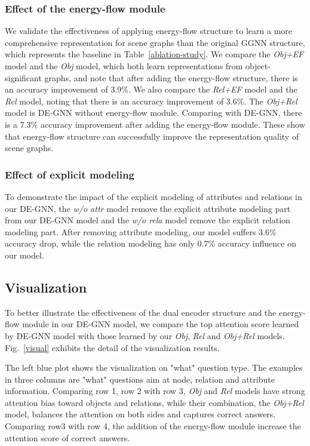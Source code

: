 \documentclass[letterpaper]{article} %
\begin{document}
\subsubsection{Effect of the energy-flow module} We validate the effectiveness of applying energy-flow structure to learn a more comprehensive representation for scene graphs than the original GGNN structure, which represents the baseline in Table~\ref{ablation-study}. We compare the \emph{Obj+EF} model and the \emph{Obj} model, which both learn representations from object-significant graphs, and note that after adding the energy-flow structure, there is an accuracy improvement of 3.9\%. We also compare the \emph{Rel+EF} model and the \emph{Rel} model, noting that there is an accuracy improvement of 3.6\%. The \emph{Obj+Rel} model is DE-GNN without energy-flow module. Comparing with DE-GNN, there is a 7.3\% accuracy improvement after adding the energy-flow module. These show that energy-flow structure can successfully improve the representation quality of scene graphs. 

\subsubsection{Effect of explicit modeling} To demonstrate the impact of the explicit modeling of attributes and relations in our DE-GNN, the \emph{w/o attr} model remove the explicit attribute modeling part from our DE-GNN model and the \emph{w/o rela} model remove the explicit relation modeling part. After removing attribute modeling, our model suffers 3.6\% accuracy drop, while the relation modeling has only 0.7\% accuracy influence on our model.



\subsection{Visualization}
To better illustrate the effectiveness of the dual encoder structure and the energy-flow module in our DE-GNN model, we compare the top attention score learned by DE-GNN model with those learned by our \emph{Obj}, \emph{Rel} and \emph{Obj+Rel} models. Fig.~\ref{visual} exhibits the detail of the visualization results.

The left blue plot shows the visualization on "what" question type. The examples in three columns are "what" questions aim at node, relation and attribute information. Comparing row 1, row 2 with row 3, \emph{Obj} and \emph{Rel} models have strong attention bias toward objects and relations, while their combination, the \emph{Obj+Rel} model, balances the attention on both sides and captures correct answers. Comparing row3 with row 4, the addition of the energy-flow module increase the attention score of correct answers. 
\end{document}
